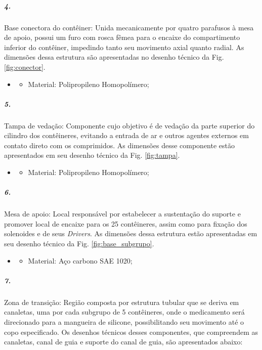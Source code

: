     
    \subparagraph*{4.}\label{retorno_conector}
    Base conectora do contêiner: Unida mecanicamente por quatro parafusos à mesa de apoio, possui um furo com rosca fêmea para o encaixe do compartimento inferior do contêiner, impedindo tanto seu movimento axial quanto radial. As dimensões dessa estrutura são apresentadas no desenho técnico da  Fig. \ref{fig:conector}.
    
    \begin{itemize}
   \item[]
   \begin{itemize}
       \item  Material: Polipropileno Homopolímero;
   \end{itemize}
   \end{itemize}
         
     
     \subparagraph*{5.}\label{retorno_tampa}
     Tampa de vedação: Componente cujo objetivo é de vedação da parte superior do cilindro dos contêineres, evitando a entrada de ar e outros agentes externos em contato direto com os comprimidos. As dimensões desse componente estão apresentados em seu desenho técnico  da Fig. \ref{fig:tampa}.
     
     \begin{itemize}
   \item[]
   \begin{itemize}
       \item  Material: Polipropileno Homopolímero;
   \end{itemize}
   \end{itemize}
      
    

\subparagraph*{6.}\label{retorno_base_subgrupo}
Mesa de apoio: Local responsável por estabelecer a sustentação do suporte e promover local de encaixe para os 25 contêineres, assim como para fixação dos solenoides e de seus \textit{Drivers}. As dimensões dessa estrutura estão apresentadas em seu desenho técnico da Fig. \ref{fig:base_subgrupo}.

\begin{itemize}
   \item[]
   \begin{itemize}
       \item  Material: Aço carbono SAE 1020;
   \end{itemize}
   \end{itemize}
 

\subparagraph*{7.}\label{retorno_zonadetransição}
Zona de transição: Região composta por estrutura tubular que se deriva em canaletas, uma por cada subgrupo de 5 contêineres, onde o medicamento será direcionado para a mangueira de silicone, possibilitando seu movimento até o copo especificado. Os desenhos técnicos desses componentes, que compreendem as canaletas, canal de guia e suporte do canal de guia, são apresentados abaixo:

